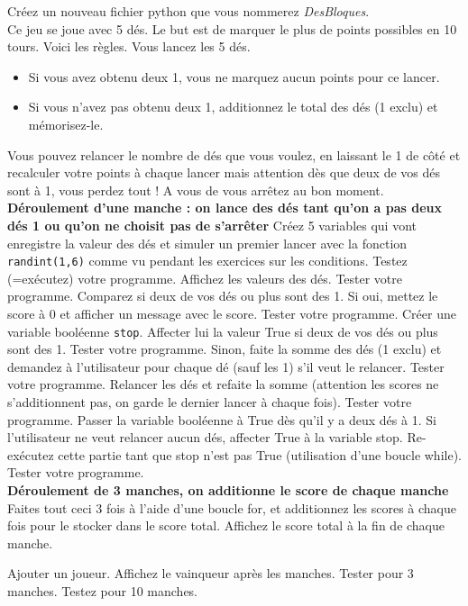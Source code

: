 \begin{Exercise}[title={Dés bloqués remix}]
Créez un nouveau fichier python que vous nommerez \textit{DesBloques}.\\
Ce jeu se joue avec 5 dés. Le but est de marquer le plus de points possibles en 10 tours. Voici les règles. Vous lancez les 5 dés.
\begin{itemize}
    \item Si vous avez obtenu deux 1, vous ne marquez aucun points pour ce lancer.
    \item Si vous n'avez pas obtenu deux 1, additionnez le total des dés (1 exclu) et mémorisez-le.
\end{itemize}
Vous pouvez relancer le nombre de dés que vous voulez, en laissant le 1 de côté et recalculer votre points à chaque lancer mais attention dès que deux de vos dés sont à 1, vous perdez tout ! A vous de vous arrêtez au bon moment.\\

%
\textbf{Déroulement d'une manche : on lance des dés tant qu'on a pas deux dés 1 ou qu'on ne choisit pas de s'arrêter}
\Question Créez 5 variables qui vont enregistre la valeur des dés et simuler un premier lancer avec la fonction \texttt{randint(1,6)} comme vu pendant les exercices sur les conditions. Testez (=exécutez) votre programme.
\Question Affichez les valeurs des dés. Tester votre programme.
\Question Comparez si deux de vos dés ou plus sont des 1. Si oui, mettez le score à 0 et afficher un message avec le score. Tester votre programme.
\Question Créer une variable booléenne \texttt{stop}. Affecter lui la valeur True si deux de vos dés ou plus sont des 1. Tester votre programme.
\Question Sinon, faite la somme des dés (1 exclu) et demandez à l'utilisateur pour chaque dé (sauf les 1) s'il veut le relancer. Tester votre programme.
\Question Relancer les dés et refaite la somme (attention les scores ne s'additionnent pas, on garde le dernier lancer à chaque fois). Tester votre programme.
\Question Passer la variable booléenne à True dès qu'il y a deux dés à 1.
\Question Si l'utilisateur ne veut relancer aucun dés, affecter True à la variable stop.
\Question Re-exécutez cette partie tant que stop n'est pas True (utilisation d'une boucle while). Tester votre programme.\\

\noindent\textbf{Déroulement de 3 manches, on additionne le score de chaque manche}
\Question Faites tout ceci 3 fois à l'aide d'une boucle for, et additionnez les scores à chaque fois pour le stocker dans le score total.
\Question Affichez le score total à la fin de chaque manche.

\Question Ajouter un joueur.
\Question Affichez le vainqueur après les manches. Tester pour 3 manches.
\Question Testez pour 10 manches.
    
\end{Exercise}